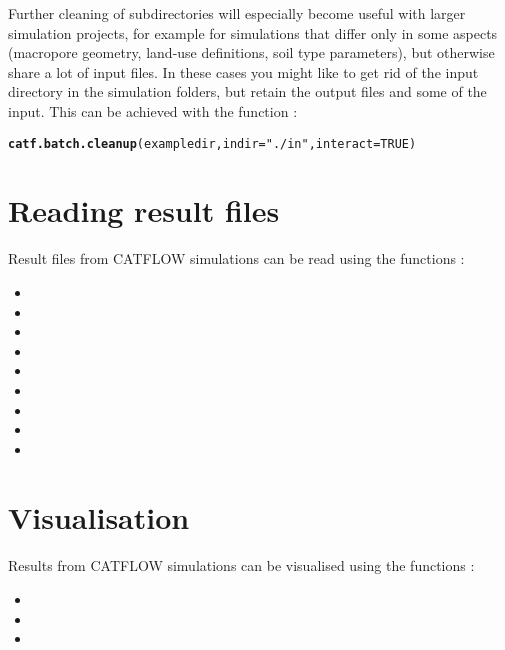 \documentclass[article,nojss]{jss}\usepackage[]{graphicx}\usepackage[]{xcolor}
\makeatletter
\newcommand{\hlnum}[1]{\textcolor[rgb]{0.686,0.059,0.569}{#1}}%
\newcommand{\hlsng}[1]{\textcolor[rgb]{0.192,0.494,0.8}{#1}}%
\newcommand{\hldef}[1]{\textcolor[rgb]{0.345,0.345,0.345}{#1}}%
\newcommand{\hlkwc}[1]{\textcolor[rgb]{0.333,0.667,0.333}{#1}}%
\newcommand{\hlkwd}[1]{\textcolor[rgb]{0.737,0.353,0.396}{\textbf{#1}}}%
\newenvironment{kframe}{%
 \def\at@end@of@kframe{}%
 \ifinner\ifhmode%
  \def\at@end@of@kframe{\end{minipage}}%
  \begin{minipage}{\columnwidth}%
 \fi\fi%
 \def\FrameCommand##1{\hskip\@totalleftmargin \hskip-\fboxsep
 \colorbox{shadecolor}{##1}\hskip-\fboxsep
     \hskip-\linewidth \hskip-\@totalleftmargin \hskip\columnwidth}%
 \MakeFramed {\advance\hsize-\width
   \@totalleftmargin\z@ \linewidth\hsize
   \@setminipage}}%
 {\par\unskip\endMakeFramed%
 \at@end@of@kframe}
\newenvironment{knitrout}{}{} %
\makeatother
\begin{document}
Further cleaning of subdirectories will especially become useful with larger simulation projects, for example for simulations that differ only in some aspects (macropore geometry, land-use definitions, soil type parameters), but otherwise share a lot of input files.
In these cases you might like to get rid of the input directory in the simulation folders, but retain the output files and some of the input. This can be achieved with the function
:
\begin{knitrout}
\color{fgcolor}\begin{kframe}
\begin{alltt}
\hlkwd{catf.batch.cleanup}\hldef{(exampledir,} \hlkwc{indir} \hldef{=} \hlsng{"./in"}\hldef{,} \hlkwc{interact} \hldef{=} \hlnum{TRUE}\hldef{)}
\end{alltt}
\end{kframe}
\end{knitrout}


\section{Reading result files}

Result files from CATFLOW simulations can be read using the functions :

\begin{itemize}
\item {}
\item {}
\item {} 
\item {}
\item {}
\item {}
\item {}
\item {}
\item {}
\end{itemize}


\section{Visualisation}

Results from CATFLOW simulations can be visualised using the functions :

\begin{itemize}
\item {}
\item {}
\item {}
\end{itemize}
\end{document}
